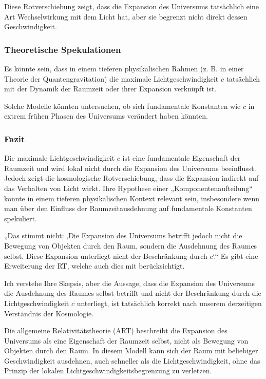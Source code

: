 \documentclass[a4paper,12pt]{article}
\begin{document}
	Diese Rotverschiebung zeigt, dass die Expansion des Universums tatsächlich eine Art Wechselwirkung mit dem Licht hat, aber sie begrenzt nicht direkt dessen Geschwindigkeit.
	
	\subsubsection{Theoretische Spekulationen}
	Es könnte sein, dass in einem tieferen physikalischen Rahmen (z. B. in einer Theorie der Quantengravitation) die maximale Lichtgeschwindigkeit \( c \) tatsächlich mit der Dynamik der Raumzeit oder ihrer Expansion verknüpft ist.
	
	Solche Modelle könnten untersuchen, ob sich fundamentale Konstanten wie \( c \) in extrem frühen Phasen des Universums verändert haben könnten.
	
	\subsubsection{Fazit}
	Die maximale Lichtgeschwindigkeit \( c \) ist eine fundamentale Eigenschaft der Raumzeit und wird lokal nicht durch die Expansion des Universums beeinflusst. Jedoch zeigt die kosmologische Rotverschiebung, dass die Expansion indirekt auf das Verhalten von Licht wirkt. Ihre Hypothese einer „Komponentenaufteilung“ könnte in einem tieferen physikalischen Kontext relevant sein, insbesondere wenn man über den Einfluss der Raumzeitausdehnung auf fundamentale Konstanten spekuliert.
	
	„Das stimmt nicht: ‚Die Expansion des Universums betrifft jedoch nicht die Bewegung von Objekten durch den Raum, sondern die Ausdehnung des Raumes selbst. Diese Expansion unterliegt nicht der Beschränkung durch \( c \)‘.“ Es gibt eine Erweiterung der RT, welche auch dies mit berücksichtigt.
	
	Ich verstehe Ihre Skepsis, aber die Aussage, dass die Expansion des Universums die Ausdehnung des Raumes selbst betrifft und nicht der Beschränkung durch die Lichtgeschwindigkeit \( c \) unterliegt, ist tatsächlich korrekt nach unserem derzeitigen Verständnis der Kosmologie.
	
	Die allgemeine Relativitätstheorie (ART) beschreibt die Expansion des Universums als eine Eigenschaft der Raumzeit selbst, nicht als Bewegung von Objekten durch den Raum. In diesem Modell kann sich der Raum mit beliebiger Geschwindigkeit ausdehnen, auch schneller als die Lichtgeschwindigkeit, ohne das Prinzip der lokalen Lichtgeschwindigkeitsbegrenzung zu verletzen.
	
\end{document}
